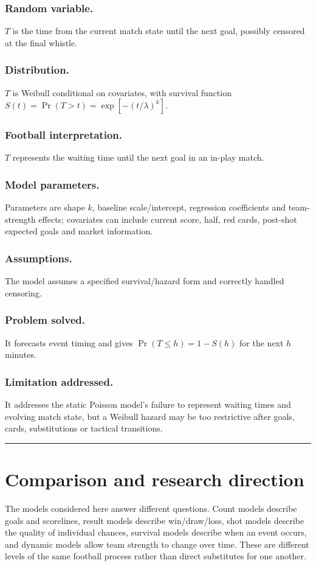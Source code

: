 \documentclass[11pt,a4paper]{amsart}
\numberwithin{equation}{section}
\begin{document}
\subsubsection*{Random variable.} $T$ is the time from the current match state until the next goal, possibly censored at the final whistle.
\subsubsection*{Distribution.} $T$ is Weibull conditional on covariates, with survival function $S(t)=\Pr(T>t)=\exp[-(t/\lambda)^k]$.
\subsubsection*{Football interpretation.} $T$ represents the waiting time until the next goal in an in-play match.
\subsubsection*{Model parameters.} Parameters are shape $k$, baseline scale/intercept, regression coefficients and team-strength effects; covariates can include current score, half, red cards, post-shot expected goals and market information.
\subsubsection*{Assumptions.} The model assumes a specified survival/hazard form and correctly handled censoring.
\subsubsection*{Problem solved.} It forecasts event timing and gives $\Pr(T\le h)=1-S(h)$ for the next $h$ minutes.
\subsubsection*{Limitation addressed.} It addresses the static Poisson model's failure to represent waiting times and evolving match state, but a Weibull hazard may be too restrictive after goals, cards, substitutions or tactical transitions.

\noindent\rule{\textwidth}{0.8pt}

\section{Comparison and research direction}
The models considered here answer different questions. Count models describe goals and scorelines, result models describe win/draw/loss, shot models describe the quality of individual chances, survival models describe when an event occurs, and dynamic models allow team strength to change over time. These are different levels of the same football process rather than direct substitutes for one another.
\end{document}
